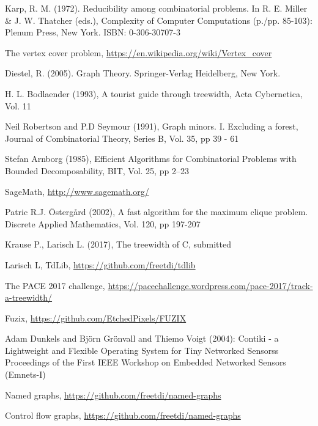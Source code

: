 \documentclass[11pt,a4paper]{article}
\begin{document}
\begin{thebibliography}{9}

 Karp, R. M. (1972). Reducibility among combinatorial problems. In R. E. Miller \& J. W. Thatcher (eds.), Complexity of Computer Computations (p./pp. 85-103): Plenum Press, New York. ISBN: 0-306-30707-3

 The vertex cover problem, \url{https://en.wikipedia.org/wiki/Vertex_cover}

 Diestel, R. (2005). Graph Theory. Springer-Verlag Heidelberg, New York. 

 H. L. Bodlaender (1993), A tourist guide through treewidth, Acta Cybernetica, Vol. 11

 Neil Robertson and P.D Seymour (1991), Graph minors. I. Excluding a forest, Journal of Combinatorial Theory, Series B, Vol. 35, pp 39 - 61

 Stefan Arnborg (1985), Efficient Algorithms for Combinatorial Problems with Bounded Decomposability, BIT, Vol. 25, pp 2--23

 SageMath, \url{http://www.sagemath.org/}

 Patric R.J. Östergård (2002), A fast algorithm for the maximum clique problem. Discrete Applied Mathematics, Vol. 120, pp 197-207

 Krause P., Larisch L. (2017), The treewidth of C, submitted

 Larisch L, TdLib, \url{https://github.com/freetdi/tdlib}

 The PACE 2017 challenge, \url{https://pacechallenge.wordpress.com/pace-2017/track-a-treewidth/}

 Fuzix, \url{https://github.com/EtchedPixels/FUZIX}

 Adam Dunkels and Björn Grönvall and Thiemo Voigt (2004): Contiki - a Lightweight and Flexible Operating System for Tiny Networked Sensorss Proceedings of the First IEEE Workshop on Embedded Networked Sensors (Emnets-I)

 Named graphs, \url{https://github.com/freetdi/named-graphs}

 Control flow graphs, \url{https://github.com/freetdi/named-graphs}


\end{thebibliography}

\newpage
\end{document}
